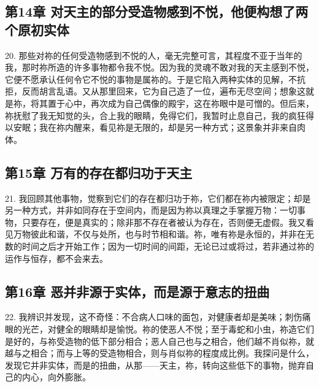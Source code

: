 
\subsection{第14章 对天主的部分受造物感到不悦，他便构想了两个原初实体}

20. 那些对祢的任何受造物感到不悦的人，毫无完整可言，其程度不亚于当年的我，那时祢所造的许多事物都令我不悦。因为我的灵魂不敢对我的天主感到不悦，它便不愿承认任何令它不悦的事物是属祢的。于是它陷入两种实体的见解，不抗拒，反而胡言乱语。又从那里回来，它为自己造了一位，遍布无尽空间；想象这就是祢，将其置于心中，再次成为自己偶像的殿宇，这在祢眼中是可憎的。但后来，祢抚慰了我无知觉的头，合上我的眼睛，免得它们，我暂时止息自己，我的疯狂得以安眠；我在祢内醒来，看见祢是无限的，却是另一种方式；这景象并非来自肉体。\par


\subsection{第15章 万有的存在都归功于天主}

21. 我回顾其他事物，觉察到它们的存在都归功于祢，它们都在祢内被限定；却是另一种方式，并非如同存在于空间内，而是因为祢以真理之手掌握万物：一切事物，只要存在，便是真实的；除非那不存在者被认为存在，否则便无虚假。我又看见万物彼此和谐，不仅与处所，也与时节相和谐。祢，唯有祢是永恒的，并非在无数的时间之后才开始工作；因为一切时间的间距，无论已过或将过，若非通过祢的运作与恒存，都不会来去。\par


\subsection{第16章 恶并非源于实体，而是源于意志的扭曲}

22. 我辨识并发现，这不奇怪：不合病人口味的面包，对健康者却是美味；刺伤痛眼的光芒，对健全的眼睛却是愉悦。祢的使恶人不悦；至于毒蛇和小虫，祢造它们是好的，与祢受造物的低下部分相合；恶人自己也与之相合，他们越不肖似祢，就越与之相合；而与上等的受造物相合，则与肖似祢的程度成比例。我探问是什么，发现它并非实体，而是的扭曲，从那——天主，祢，转向这些低下的事物，抛弃自己的内心，向外膨胀。\par

